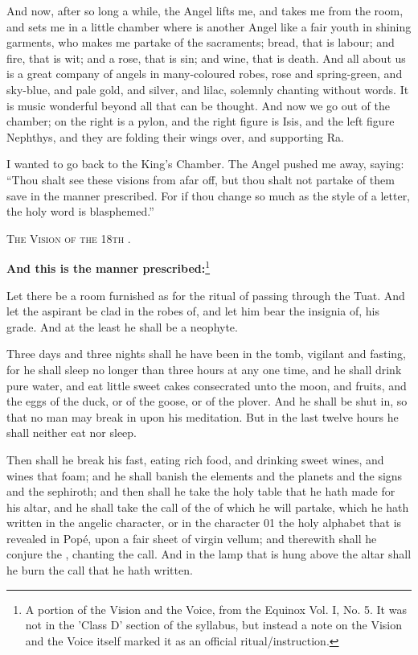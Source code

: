 \epigraph{And now, after so long a while, the Angel lifts me, and takes me from the room, and sets me in a little chamber where is another Angel like a fair youth in shining garments, who makes me partake of the sacraments; bread, that is labour; and fire, that is wit; and a rose, that is sin; and wine, that is death. And all about us is a great company of angels in many-coloured robes, rose and spring-green, and sky-blue, and pale gold, and silver, and lilac, solemnly chanting without words. It is music wonderful beyond all that can be thought. And now we go out of the chamber; on the right is a pylon, and the right figure is Isis, and the left figure Nephthys, and they are folding their wings over, and supporting Ra.

I wanted to go back to the King's Chamber. The Angel pushed me away, saying: \enquote{Thou shalt see these visions from afar off, but thou shalt not partake of them save in the manner prescribed. For if thou change so much as the style of a letter, the holy word is blasphemed.}}{\textsc{The Vision of the 18th \AEthyr{}.}}

\textbf{And this is the manner prescribed:}\footnote{A portion of the Vision and the Voice, from the Equinox Vol. I, No. 5. It was not in the 'Class D' section of the \Argentium{} syllabus, but instead a note on the Vision and the Voice itself marked it as an official ritual/instruction.}

Let there be a room furnished as for the ritual of passing through the Tuat. And let the aspirant be clad in the robes of, and let him bear the insignia of, his grade. And at the least he shall be a neophyte.

Three days and three nights shall he have been in the tomb, vigilant and fasting, for he shall sleep no longer than three hours at any one time, and he shall drink pure water, and eat little sweet cakes consecrated unto the moon, and fruits, and the eggs of the duck, or of the goose, or of the plover. And he shall be shut in, so that no man may break in upon his meditation. But in the last twelve hours he shall neither eat nor sleep.

Then shall he break his fast, eating rich food, and drinking sweet wines, and wines that foam; and he shall banish the elements and the planets and the signs and the sephiroth; and then shall he take the holy table that he hath made for his altar, and he shall take the call of the \AEthyr{} of which he will partake, which he hath written in the angelic character, or in the character 01 the holy alphabet that is revealed in Pop\'{e}, upon a fair sheet of virgin vellum; and therewith shall he conjure the \AEthyr{}, chanting the call. And in the lamp that is hung above the altar shall he burn the call that he hath written.

